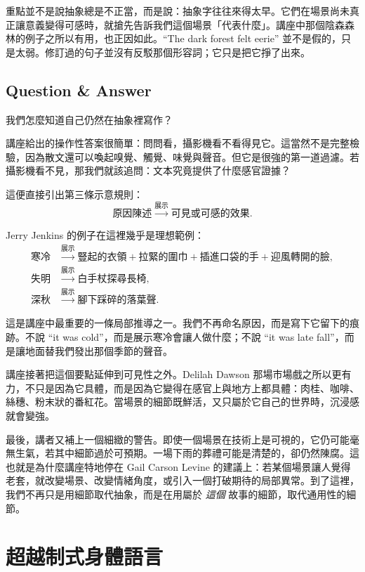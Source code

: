 重點並不是說抽象總是不正當，而是說：抽象字往往來得太早。它們在場景尚未真正讓意義變得可感時，就搶先告訴我們這個場景「代表什麼」。講座中那個陰森森林的例子之所以有用，也正因如此。``The dark forest felt eerie'' 並不是假的，只是太弱。修訂過的句子並沒有反駁那個形容詞；它只是把它掙了出來。

\subsection{Question \& Answer}

我們怎麼知道自己仍然在抽象裡寫作？

講座給出的操作性答案很簡單：問問看，攝影機看不看得見它。這當然不是完整檢驗，因為散文還可以喚起嗅覺、觸覺、味覺與聲音。但它是很強的第一道過濾。若攝影機看不見，那我們就該追問：文本究竟提供了什麼感官證據？

這便直接引出第三條示意規則：
\begin{equation}
\text{原因陳述} \xrightarrow{\text{展示}} \text{可見或可感的效果}.
\end{equation}

Jerry Jenkins 的例子在這裡幾乎是理想範例：
\begin{align}
\text{寒冷}
&\xrightarrow{\text{展示}}
\text{豎起的衣領} + \text{拉緊的圍巾} + \text{插進口袋的手} + \text{迎風轉開的臉},\\
\text{失明}
&\xrightarrow{\text{展示}}
\text{白手杖探尋長椅},\\
\text{深秋}
&\xrightarrow{\text{展示}}
\text{腳下踩碎的落葉聲}.
\end{align}

這是講座中最重要的一條局部推導之一。我們不再命名原因，而是寫下它留下的痕跡。不說 ``it was cold''，而是展示寒冷會讓人做什麼；不說 ``it was late fall''，而是讓地面替我們發出那個季節的聲音。

講座接著把這個要點延伸到可見性之外。Delilah Dawson 那場市場戲之所以更有力，不只是因為它具體，而是因為它變得在感官上與地方上都具體：肉桂、咖啡、絲穗、粉末狀的番紅花。當場景的細節既鮮活，又只屬於它自己的世界時，沉浸感就會變強。

最後，講者又補上一個細緻的警告。即使一個場景在技術上是可視的，它仍可能毫無生氣，若其中細節過於可預期。一場下雨的葬禮可能是清楚的，卻仍然陳腐。這也就是為什麼講座特地停在 Gail Carson Levine 的建議上：若某個場景讓人覺得老套，就改變場景、改變情緒角度，或引入一個打破期待的局部異常。到了這裡，我們不再只是用細節取代抽象，而是在用屬於 \emph{這個} 故事的細節，取代通用性的細節。

\section{超越制式身體語言}

